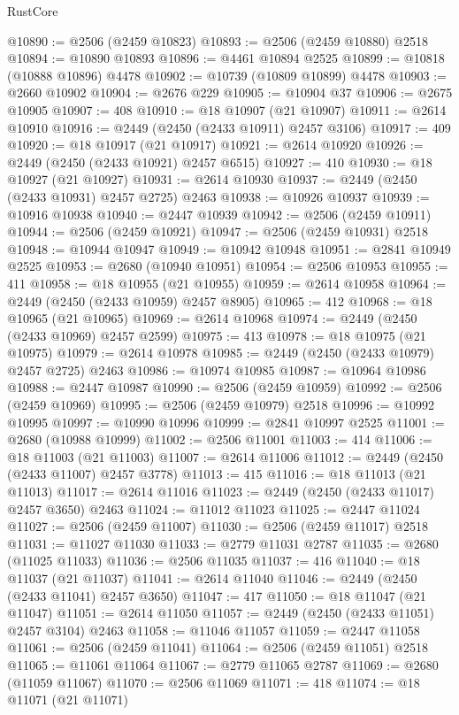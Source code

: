 \begin{lexlean}{RustCore}
\begin{coremodule}
@10890 := @2506 (@2459 @10823)
@10893 := @2506 (@2459 @10880) @2518
@10894 := @10890 @10893
@10896 := @4461 @10894 @2525
@10899 := @10818 (@10888 @10896) @4478
@10902 := @10739 (@10809 @10899) @4478
@10903 := @2660 @10902
@10904 := @2676 @229
@10905 := @10904 @37
@10906 := @2675 @10905
@10907 := 408
@10910 := @18 @10907 (@21 @10907)
@10911 := @2614 @10910
@10916 := @2449 (@2450 (@2433 @10911) @2457 @3106)
@10917 := 409
@10920 := @18 @10917 (@21 @10917)
@10921 := @2614 @10920
@10926 := @2449 (@2450 (@2433 @10921) @2457 @6515)
@10927 := 410
@10930 := @18 @10927 (@21 @10927)
@10931 := @2614 @10930
@10937 := @2449 (@2450 (@2433 @10931) @2457 @2725) @2463
@10938 := @10926 @10937
@10939 := @10916 @10938
@10940 := @2447 @10939
@10942 := @2506 (@2459 @10911)
@10944 := @2506 (@2459 @10921)
@10947 := @2506 (@2459 @10931) @2518
@10948 := @10944 @10947
@10949 := @10942 @10948
@10951 := @2841 @10949 @2525
@10953 := @2680 (@10940 @10951)
@10954 := @2506 @10953
@10955 := 411
@10958 := @18 @10955 (@21 @10955)
@10959 := @2614 @10958
@10964 := @2449 (@2450 (@2433 @10959) @2457 @8905)
@10965 := 412
@10968 := @18 @10965 (@21 @10965)
@10969 := @2614 @10968
@10974 := @2449 (@2450 (@2433 @10969) @2457 @2599)
@10975 := 413
@10978 := @18 @10975 (@21 @10975)
@10979 := @2614 @10978
@10985 := @2449 (@2450 (@2433 @10979) @2457 @2725) @2463
@10986 := @10974 @10985
@10987 := @10964 @10986
@10988 := @2447 @10987
@10990 := @2506 (@2459 @10959)
@10992 := @2506 (@2459 @10969)
@10995 := @2506 (@2459 @10979) @2518
@10996 := @10992 @10995
@10997 := @10990 @10996
@10999 := @2841 @10997 @2525
@11001 := @2680 (@10988 @10999)
@11002 := @2506 @11001
@11003 := 414
@11006 := @18 @11003 (@21 @11003)
@11007 := @2614 @11006
@11012 := @2449 (@2450 (@2433 @11007) @2457 @3778)
@11013 := 415
@11016 := @18 @11013 (@21 @11013)
@11017 := @2614 @11016
@11023 := @2449 (@2450 (@2433 @11017) @2457 @3650) @2463
@11024 := @11012 @11023
@11025 := @2447 @11024
@11027 := @2506 (@2459 @11007)
@11030 := @2506 (@2459 @11017) @2518
@11031 := @11027 @11030
@11033 := @2779 @11031 @2787
@11035 := @2680 (@11025 @11033)
@11036 := @2506 @11035
@11037 := 416
@11040 := @18 @11037 (@21 @11037)
@11041 := @2614 @11040
@11046 := @2449 (@2450 (@2433 @11041) @2457 @3650)
@11047 := 417
@11050 := @18 @11047 (@21 @11047)
@11051 := @2614 @11050
@11057 := @2449 (@2450 (@2433 @11051) @2457 @3104) @2463
@11058 := @11046 @11057
@11059 := @2447 @11058
@11061 := @2506 (@2459 @11041)
@11064 := @2506 (@2459 @11051) @2518
@11065 := @11061 @11064
@11067 := @2779 @11065 @2787
@11069 := @2680 (@11059 @11067)
@11070 := @2506 @11069
@11071 := 418
@11074 := @18 @11071 (@21 @11071)

\end{coremodule}
\end{lexlean}
